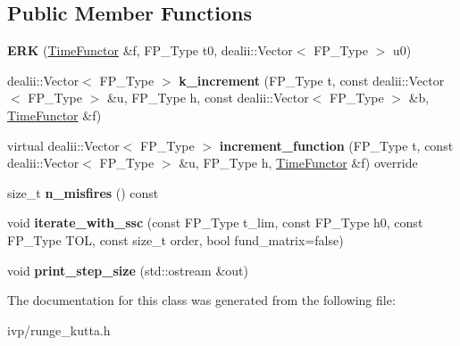 \subsection*{Public Member Functions}
\begin{DoxyCompactItemize}
\item 
\mbox{\label{classERK_a2e9bccb7699bc97bd3800c25d86ee814}} 
{\bfseries E\+RK} (\hyperlink{classTimeFunctor}{Time\+Functor} \&f, F\+P\+\_\+\+Type t0, dealii\+::\+Vector$<$ F\+P\+\_\+\+Type $>$ u0)
\item 
\mbox{\label{classERK_afae19be9dd7961c2324deda0f2439c74}} 
dealii\+::\+Vector$<$ F\+P\+\_\+\+Type $>$ {\bfseries k\+\_\+increment} (F\+P\+\_\+\+Type t, const dealii\+::\+Vector$<$ F\+P\+\_\+\+Type $>$ \&u, F\+P\+\_\+\+Type h, const dealii\+::\+Vector$<$ F\+P\+\_\+\+Type $>$ \&b, \hyperlink{classTimeFunctor}{Time\+Functor} \&f)
\item 
\mbox{\label{classERK_a96ece8656df8073bc85281ef29706856}} 
virtual dealii\+::\+Vector$<$ F\+P\+\_\+\+Type $>$ {\bfseries increment\+\_\+function} (F\+P\+\_\+\+Type t, const dealii\+::\+Vector$<$ F\+P\+\_\+\+Type $>$ \&u, F\+P\+\_\+\+Type h, \hyperlink{classTimeFunctor}{Time\+Functor} \&f) override
\item 
\mbox{\label{classERK_ae3f71b3f5364ffcab63a715d95adb911}} 
size\+\_\+t {\bfseries n\+\_\+misfires} () const
\item 
\mbox{\label{classERK_a4078c1ed0c303d456c1f6e7c25bc0121}} 
void {\bfseries iterate\+\_\+with\+\_\+ssc} (const F\+P\+\_\+\+Type t\+\_\+lim, const F\+P\+\_\+\+Type h0, const F\+P\+\_\+\+Type T\+OL, const size\+\_\+t order, bool fund\+\_\+matrix=false)
\item 
\mbox{\label{classERK_a6057b70fbd97bbe2e5b2d0233aef46a4}} 
void {\bfseries print\+\_\+step\+\_\+size} (std\+::ostream \&out)
\end{DoxyCompactItemize}


The documentation for this class was generated from the following file\+:\begin{DoxyCompactItemize}
\item 
ivp/runge\+\_\+kutta.\+h\end{DoxyCompactItemize}
